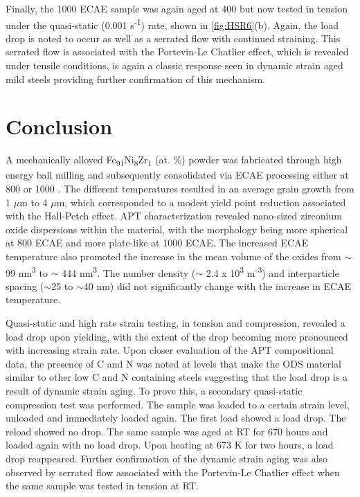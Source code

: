 		Finally, the 1000 \celsius{}   ECAE sample was again aged at 400 \celsius{}   but now tested in tension under the quasi-static (0.001 s\textsuperscript{-1}) rate, shown in \ref{fig:HSR6}(b). Again, the load drop is noted to occur as well as a serrated flow with continued straining. This serrated flow is associated with the Portevin-Le Chatlier effect, which is revealed under tensile conditions, is again a classic response seen in dynamic strain aged mild steels providing further confirmation of this mechanism. 

\section*{Conclusion}
	A mechanically alloyed Fe\textsubscript{91}Ni\textsubscript{8}Zr\textsubscript{1} (at. \%) powder was fabricated through high energy ball milling and subsequently consolidated via ECAE processing either at 800 \celsius{} or 1000 \celsius{}. The different temperatures resulted in an average grain growth from 1 $\mu$m to 4 $\mu$m, which corresponded to a modest yield point reduction associated with the Hall-Petch effect. APT characterization revealed nano-sized zirconium oxide dispersions within the material, with the morphology being more spherical at 800 \celsius{} ECAE and more plate-like at 1000 \celsius{}   ECAE. The increased ECAE temperature also promoted the increase in the mean volume of the oxides from $\sim$ 99 nm\textsuperscript{3} to $\sim$ 444 nm\textsuperscript{3}. The number density ($\sim$ 2.4 x 10\textsuperscript{3} m\textsuperscript{-3}) and interparticle spacing ($\sim$25 to $\sim$40 nm) did not significantly change with the increase in ECAE temperature.
	
	Quasi-static and high rate strain testing, in tension and compression, revealed a load drop upon yielding, with the extent of the drop becoming more pronounced with increasing strain rate. Upon closer evaluation of the APT compositional data, the presence of C and N was noted at levels that make the ODS material similar to other low C and N containing steels suggesting that the load drop is a result of dynamic strain aging. To prove this, a secondary quasi-static compression test was performed. The sample was loaded to a certain strain level, unloaded and immediately loaded again. The first load showed a load drop. The reload showed no drop. The same sample was aged at RT for 670 hours and loaded again with no load drop. Upon heating at 673 K for two hours, a load drop reappeared. Further confirmation of the dynamic strain aging was also observed by serrated flow associated with the Portevin-Le Chatlier effect when the same sample was tested in tension at RT. 
	
